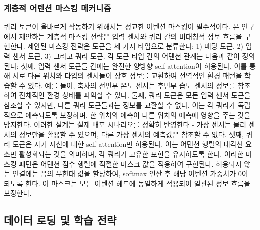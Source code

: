 \documentclass[final,5p,times,twocolumn,authoryear]{elsarticle}
\begin{document}
\subsubsection{계층적 어텐션 마스킹 메커니즘}
쿼리 토큰이 올바르게 작동하기 위해서는 정교한 어텐션 마스킹이 필수적이다. 본 연구에서 제안하는 계층적 마스킹 전략은 입력 센서와 쿼리 간의 비대칭적 정보 흐름을 구현한다.
제안된 마스킹 전략은 토큰을 세 가지 타입으로 분류한다: 1) 패딩 토큰, 2) 입력 센서 토큰, 3) 그리고 쿼리 토큰. 각 토큰 타입 간의 어텐션 관계는 다음과 같이 정의된다:
첫째, 입력 센서 토큰들 간에는 완전한 양방향 self-attention이 허용된다. 이를 통해 서로 다른 위치와 타입의 센서들이 상호 정보를 교환하여 전역적인 환경 패턴을 학습할 수 있다. 예를 들어, 축사의 전면부 온도 센서는 후면부 습도 센서의 정보를 참조하여 전체적인 환경 상태를 파악할 수 있다.
둘째, 쿼리 토큰은 모든 입력 센서 토큰을 참조할 수 있지만, 다른 쿼리 토큰들과는 정보를 교환할 수 없다. 이는 각 쿼리가 독립적으로 예측되도록 보장하며, 한 위치의 예측이 다른 위치의 예측에 영향을 주는 것을 방지한다. 이러한 설계는 실제 배포 시나리오를 정확히 반영한다 - 가상 센서는 물리 센서의 정보만을 활용할 수 있으며, 다른 가상 센서의 예측값은 참조할 수 없다.
셋째, 쿼리 토큰은 자기 자신에 대한 self-attention만 허용된다. 이는 어텐션 행렬의 대각선 요소만 활성화되는 것을 의미하며, 각 쿼리가 고유한 표현을 유지하도록 한다.
이러한 마스킹 패턴은 어텐션 점수 행렬에 적절한 마스크 값을 적용하여 구현된다. 허용되지 않는 연결에는 음의 무한대 값을 할당하여, softmax 연산 후 해당 어텐션 가중치가 0이 되도록 한다. 이 마스크는 모든 어텐션 헤드에 동일하게 적용되어 일관된 정보 흐름을 보장한다.


\subsection{데이터 로딩 및 학습 전략}
\end{document}
